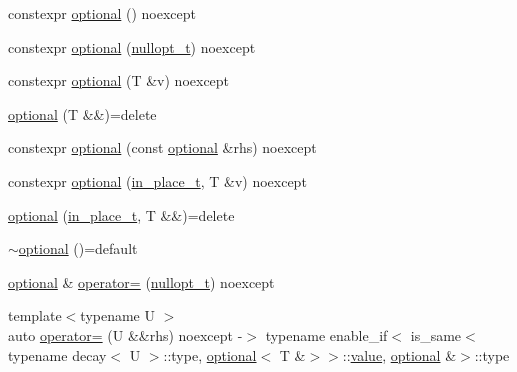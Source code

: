 \begin{DoxyCompactItemize}
\item 
constexpr \hyperlink{classstd_1_1experimental_1_1optional_3_01_t_01_6_01_4_af1ca4fe03c90cf9cb58e65fde8fd103f}{optional} () noexcept
\item 
constexpr \hyperlink{classstd_1_1experimental_1_1optional_3_01_t_01_6_01_4_a745fea438842ecd75aaf55b508a072ac}{optional} (\hyperlink{structstd_1_1experimental_1_1nullopt__t}{nullopt\+\_\+t}) noexcept
\item 
constexpr \hyperlink{classstd_1_1experimental_1_1optional_3_01_t_01_6_01_4_a10614cd2647a523b5b8d6ec4fff1bbd5}{optional} (T \&v) noexcept
\item 
\hyperlink{classstd_1_1experimental_1_1optional_3_01_t_01_6_01_4_ad7d66f5c33a6fb9ca9c0fdb25f61036e}{optional} (T \&\&)=delete
\item 
constexpr \hyperlink{classstd_1_1experimental_1_1optional_3_01_t_01_6_01_4_ad9dc3e3c32f40151798d6ce2f0435b0d}{optional} (const \hyperlink{classstd_1_1experimental_1_1optional}{optional} \&rhs) noexcept
\item 
constexpr \hyperlink{classstd_1_1experimental_1_1optional_3_01_t_01_6_01_4_a5c5cac399d59bc9d499a369367110289}{optional} (\hyperlink{structstd_1_1experimental_1_1in__place__t}{in\+\_\+place\+\_\+t}, T \&v) noexcept
\item 
\hyperlink{classstd_1_1experimental_1_1optional_3_01_t_01_6_01_4_accb8a2372c834051b76329222d6e737f}{optional} (\hyperlink{structstd_1_1experimental_1_1in__place__t}{in\+\_\+place\+\_\+t}, T \&\&)=delete
\item 
\hyperlink{classstd_1_1experimental_1_1optional_3_01_t_01_6_01_4_a6da1c8d60a81dde58445da2b33430a05}{$\sim$optional} ()=default
\item 
\hyperlink{classstd_1_1experimental_1_1optional}{optional} \& \hyperlink{classstd_1_1experimental_1_1optional_3_01_t_01_6_01_4_af8f513f05e0710ae389c77721e02c4b8}{operator=} (\hyperlink{structstd_1_1experimental_1_1nullopt__t}{nullopt\+\_\+t}) noexcept
\item 
{\footnotesize template$<$typename U $>$ }\\auto \hyperlink{classstd_1_1experimental_1_1optional_3_01_t_01_6_01_4_a0ccf7e1456d6cdfa46a0a0a6de2f88ba}{operator=} (U \&\&rhs) noexcept -\/$>$ typename enable\+\_\+if$<$ is\+\_\+same$<$ typename decay$<$ U $>$\+::type, \hyperlink{classstd_1_1experimental_1_1optional}{optional}$<$ T \&$>$$>$\+::\hyperlink{classstd_1_1experimental_1_1optional_ad1277f09c288255dfe102b72e7107be6}{value}, \hyperlink{classstd_1_1experimental_1_1optional}{optional} \&$>$\+::type
$$
\end{DoxyCompactItemize}
